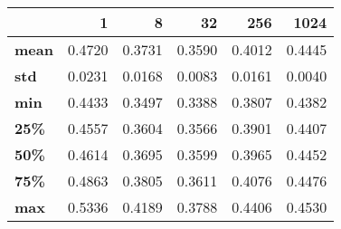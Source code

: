 \begin{tabular}{lrrrrr}
\toprule
{} &       1 &       8 &      32 &     256 &    1024 \\
\midrule
\textbf{mean} &  0.4720 &  0.3731 &  0.3590 &  0.4012 &  0.4445 \\
\textbf{std } &  0.0231 &  0.0168 &  0.0083 &  0.0161 &  0.0040 \\
\textbf{min } &  0.4433 &  0.3497 &  0.3388 &  0.3807 &  0.4382 \\
\textbf{25\% } &  0.4557 &  0.3604 &  0.3566 &  0.3901 &  0.4407 \\
\textbf{50\% } &  0.4614 &  0.3695 &  0.3599 &  0.3965 &  0.4452 \\
\textbf{75\% } &  0.4863 &  0.3805 &  0.3611 &  0.4076 &  0.4476 \\
\textbf{max } &  0.5336 &  0.4189 &  0.3788 &  0.4406 &  0.4530 \\
\bottomrule
\end{tabular}
